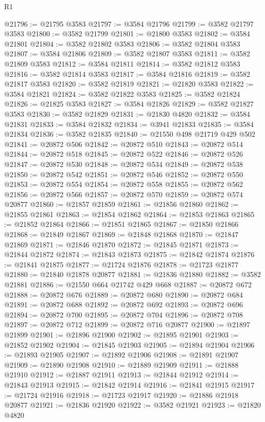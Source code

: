 \begin{lexlean}{R1}
\begin{coremodule}
@21796 := @21795 @3583
@21797 := @3584 @21796
@21799 := @3582 @21797 @3583
@21800 := @3582 @21799
@21801 := @21800 @3583
@21802 := @3584 @21801
@21804 := @3582 @21802 @3583
@21806 := @3582 @21804 @3583
@21807 := @3584 @21806
@21809 := @3582 @21807 @3583
@21811 := @3582 @21809 @3583
@21812 := @3584 @21811
@21814 := @3582 @21812 @3583
@21816 := @3582 @21814 @3583
@21817 := @3584 @21816
@21819 := @3582 @21817 @3583
@21820 := @3582 @21819
@21821 := @21820 @3583
@21822 := @3584 @21821
@21824 := @3582 @21822 @3583
@21825 := @3582 @21824
@21826 := @21825 @3583
@21827 := @3584 @21826
@21829 := @3582 @21827 @3583
@21830 := @3582 @21829
@21831 := @21830 @4820
@21832 := @3584 @21831
@21833 := @3584 @21832
@21834 := @3941 @21833
@21835 := @3584 @21834
@21836 := @3582 @21835
@21840 := @21550 @498 @21719 @429 @502
@21841 := @20872 @506
@21842 := @20872 @510
@21843 := @20872 @514
@21844 := @20872 @518
@21845 := @20872 @522
@21846 := @20872 @526
@21847 := @20872 @530
@21848 := @20872 @534
@21849 := @20872 @538
@21850 := @20872 @542
@21851 := @20872 @546
@21852 := @20872 @550
@21853 := @20872 @554
@21854 := @20872 @558
@21855 := @20872 @562
@21856 := @20872 @566
@21857 := @20872 @570
@21859 := @20872 @574 @20877
@21860 := @21857 @21859
@21861 := @21856 @21860
@21862 := @21855 @21861
@21863 := @21854 @21862
@21864 := @21853 @21863
@21865 := @21852 @21864
@21866 := @21851 @21865
@21867 := @21850 @21866
@21868 := @21849 @21867
@21869 := @21848 @21868
@21870 := @21847 @21869
@21871 := @21846 @21870
@21872 := @21845 @21871
@21873 := @21844 @21872
@21874 := @21843 @21873
@21875 := @21842 @21874
@21876 := @21841 @21875
@21877 := @21724 @21876
@21878 := @21723 @21877
@21880 := @21840 @21878 @20877
@21881 := @21836 @21880
@21882 := @3582 @21881
@21886 := @21550 @664 @21742 @429 @668
@21887 := @20872 @672
@21888 := @20872 @676
@21889 := @20872 @680
@21890 := @20872 @684
@21891 := @20872 @688
@21892 := @20872 @692
@21893 := @20872 @696
@21894 := @20872 @700
@21895 := @20872 @704
@21896 := @20872 @708
@21897 := @20872 @712
@21899 := @20872 @716 @20877
@21900 := @21897 @21899
@21901 := @21896 @21900
@21902 := @21895 @21901
@21903 := @21852 @21902
@21904 := @21845 @21903
@21905 := @21894 @21904
@21906 := @21893 @21905
@21907 := @21892 @21906
@21908 := @21891 @21907
@21909 := @21890 @21908
@21910 := @21889 @21909
@21911 := @21888 @21910
@21912 := @21887 @21911
@21913 := @21844 @21912
@21914 := @21843 @21913
@21915 := @21842 @21914
@21916 := @21841 @21915
@21917 := @21724 @21916
@21918 := @21723 @21917
@21920 := @21886 @21918 @20877
@21921 := @21836 @21920
@21922 := @3582 @21921
@21923 := @21820 @4820

\end{coremodule}
\end{lexlean}
